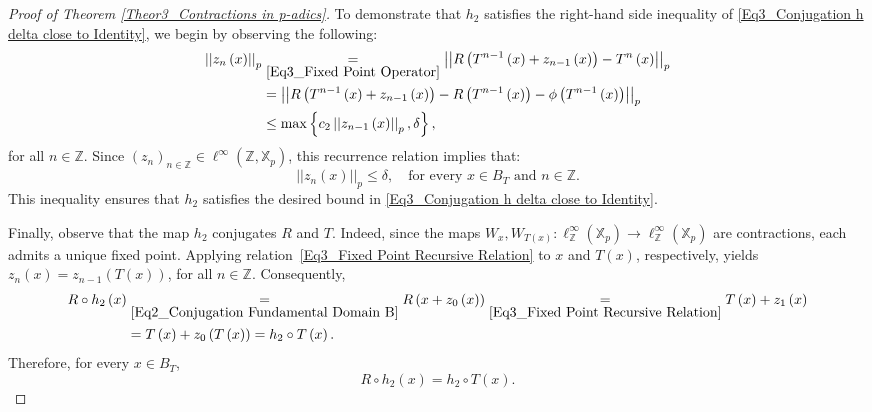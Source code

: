 \documentclass[a4paper, 12pt]{article}
\theoremstyle{definition}
\begin{document}
\begin{proof}[Proof of Theorem \ref{Theor3_Contractions in p-adics}]
		
		To demonstrate that $h_{2}$ satisfies the right-hand side inequality of \eqref{Eq3_Conjugation h delta close to Identity}, we begin by observing the following:   
		\begin{align*}  \left| \left|  z_{n} \left(  x  \right)   \right|  \right|_{p}   &
			\underset{\eqref{Eq3_Fixed Point Operator}}{=}    \left| \left|  R \left(  T^{n-1} \left(  x  \right)  + z_{n-1} \left(  x  \right)   \right)  - T^{n} \left(  x  \right)    \right|  \right|_{p}  \\  
			& =    \left| \left|  R \left(  T^{n-1} \left(  x  \right)  + z_{n-1} \left(  x  \right)   \right)  - R \left(  T^{n-1} \left(  x  \right)   \right)  - \phi \left(  T^{n-1} \left(  x  \right)   \right)    \right|  \right|_{p}   \\  
			& \le    \max \left\{  c_{2}  \left| \left|  z_{n-1} \left(  x  \right)   \right|  \right|_{p},   \delta  \right\} ,
		\end{align*}
		for all $n \in \mathbb{Z} $. Since $ \left(  z_{n}   \right)_{n \in \mathbb{Z} } \in \ell^{ \infty } \left(  \mathbb{Z} , \mathbb{X}_{p}  \right) $, this recurrence relation implies that:  
		\begin{equation}\label{Eq3_Fixed Point delta small}
			\left| \left|  z_{n} \left(  x  \right)   \right|  \right|_{p}   \le   \delta, \quad \text{for every } x \in B_{T} \text{ and } n \in \mathbb{Z} . 
		\end{equation}
		This inequality ensures that $h_{2}$ satisfies the desired bound in \eqref{Eq3_Conjugation h delta close to Identity}.
		
		
		Finally, observe that the map $h_{2}$ conjugates $R$ and $T$. 
		Indeed, since the maps $W_{x}, W_{T \left(  x  \right) } : \ell^{ \infty }_{\mathbb{Z} } \left(  \mathbb{X}_{p}  \right)  \to \ell^{ \infty }_{\mathbb{Z} } \left(  \mathbb{X}_{p}  \right) $ are contractions, each admits a unique fixed point. Applying relation~\eqref{Eq3_Fixed Point Recursive Relation} to $x$ and $T \left(  x  \right) $, respectively, yields $ z_{n} \left(  x  \right)  = z_{n - 1} \left(  T \left(  x  \right)   \right) $, for all $n \in \mathbb{Z} $. Consequently,  
		\begin{align*} 
			R \circ h_{2} \left(  x  \right)    &\underset{\eqref{Eq2_Conjugation Fundamental Domain B}}{=}   R \left(  x + z_{0} \left(  x  \right)   \right)    \underset{\eqref{Eq3_Fixed Point Recursive Relation}}{=}   T \left(  x  \right)  + z_{1} \left(  x  \right)   \\  
			&=   T \left(  x  \right)  + z_{0} \left(  T \left(  x  \right)   \right)    =   h_{2} \circ T \left(  x  \right)  .
		\end{align*}
		Therefore, for every $x \in B_{T}$,  
		\begin{equation}\label{Eq3_Homeorphism 2 Conjugation}
			R\circ h_{2} \left(  x  \right)    =   h_{2} \circ T(x) .
		\end{equation}
		

\end{proof}
\end{document}
